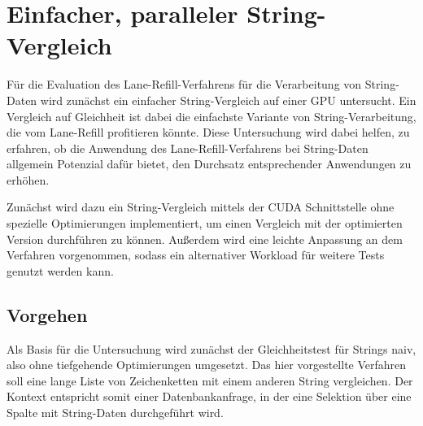 \chapter{Einfacher, paralleler String-Vergleich}

Für die Evaluation des Lane-Refill-Verfahrens für die Verarbeitung von String-Daten wird zunächst ein einfacher String-Vergleich auf einer GPU untersucht.
Ein Vergleich auf Gleichheit ist dabei die einfachste Variante von String-Verarbeitung, die vom Lane-Refill profitieren könnte.
Diese Untersuchung wird dabei helfen, zu erfahren, ob die Anwendung des Lane-Refill-Verfahrens bei String-Daten allgemein Potenzial dafür bietet, den Durchsatz entsprechender Anwendungen zu erhöhen.

Zunächst wird dazu ein String-Vergleich mittels der CUDA Schnittstelle ohne spezielle Optimierungen implementiert, um einen Vergleich mit der optimierten Version durchführen zu können.
Außerdem wird eine leichte Anpassung an dem Verfahren vorgenommen, sodass ein alternativer Workload für weitere Tests genutzt werden kann.

\section{Vorgehen}

Als Basis für die Untersuchung wird zunächst der Gleichheitstest für Strings naiv, also ohne tiefgehende Optimierungen umgesetzt.
Das hier vorgestellte Verfahren soll eine lange Liste von Zeichenketten mit einem anderen String vergleichen.
Der Kontext entspricht somit einer Datenbankanfrage, in der eine Selektion über eine Spalte mit String-Daten durchgeführt wird.


